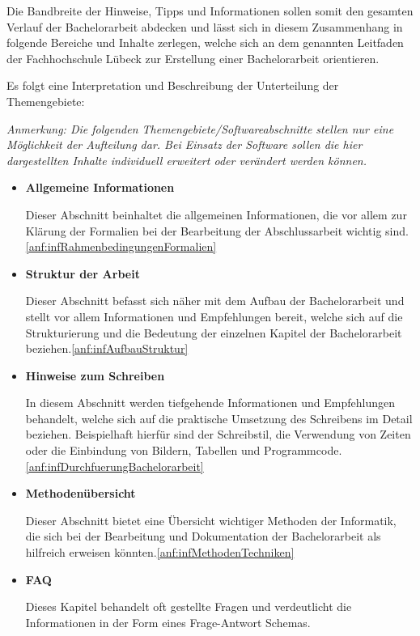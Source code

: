\documentclass[bibliography=totoc,listof=totoc,BCOR=5mm,DIV=12,oneside]{scrbook}
\begin{document}
\par\medskip Die Bandbreite der Hinweise, Tipps und Informationen sollen somit den gesamten Verlauf der Bachelorarbeit abdecken und lässt sich in diesem Zusammenhang in folgende Bereiche und Inhalte zerlegen, welche sich an dem genannten Leitfaden der Fachhochschule Lübeck zur Erstellung einer Bachelorarbeit orientieren.

\par\medskip Es folgt eine Interpretation und Beschreibung der Unterteilung der Themengebiete:

\par\medskip \textit{Anmerkung: Die folgenden Themengebiete/Softwareabschnitte stellen nur eine Möglichkeit der Aufteilung dar. Bei Einsatz der Software sollen die hier dargestellten Inhalte individuell erweitert oder verändert werden können.}

\begin{itemize}
\item \textbf{Allgemeine Informationen}
\par Dieser Abschnitt beinhaltet die allgemeinen Informationen, die vor allem zur Klärung der Formalien bei der Bearbeitung der Abschlussarbeit wichtig sind.\ref{anf:infRahmenbedingungenFormalien}

\item \textbf{Struktur der Arbeit}
\par Dieser Abschnitt befasst sich näher mit dem Aufbau der Bachelorarbeit und stellt vor allem Informationen und Empfehlungen bereit, welche sich auf die Strukturierung und die Bedeutung der einzelnen Kapitel der Bachelorarbeit beziehen.\ref{anf:infAufbauStruktur}

\item \textbf{Hinweise zum Schreiben}
\par In diesem Abschnitt werden tiefgehende Informationen und Empfehlungen behandelt, welche sich auf die praktische Umsetzung des Schreibens im Detail beziehen. Beispielhaft hierfür sind der Schreibstil, die Verwendung von Zeiten oder die Einbindung von Bildern, Tabellen und Programmcode.\ref{anf:infDurchfuerungBachelorarbeit}

\item \textbf{Methodenübersicht}
\par Dieser Abschnitt bietet eine Übersicht wichtiger Methoden der Informatik, die sich bei der Bearbeitung und Dokumentation der Bachelorarbeit als hilfreich erweisen könnten.\ref{anf:infMethodenTechniken}

\item \textbf{FAQ}
\par Dieses Kapitel behandelt oft gestellte Fragen und verdeutlicht die Informationen in der Form eines Frage-Antwort Schemas.
\end{itemize}
\end{document}
